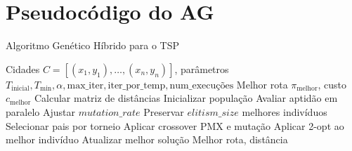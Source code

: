 \documentclass[11pt]{article}
\begin{document}
\section{Pseudocódigo do AG}\label{app:ag}
\begin{algorithm}
    \caption{Algoritmo Genético Híbrido para o TSP}
    \begin{algorithmic}[1]
        \Require Cidades \(C = [(x_1, y_1), \ldots, (x_n, y_n)]\), parâmetros \(T_{\text{inicial}}, T_{\text{min}}, \alpha, \text{max\_iter}, \text{iter\_por\_temp}, \text{num\_execuções}\)
        \Ensure Melhor rota \(\pi_{\text{melhor}}\), custo \(c_{\text{melhor}}\)
        \State Calcular matriz de distâncias
        \State Inicializar população
        \State Avaliar aptidão em paralelo
            \State Ajustar \(mutation\_rate\)
            \State Preservar \(elitism\_size\) melhores indivíduos
                \State Selecionar pais por torneio
                \State Aplicar crossover PMX e mutação
            \EndWhile
                \State Aplicar 2-opt ao melhor indivíduo
            \EndIf
            \State Atualizar melhor solução
        \EndFor
        \State \Return Melhor rota, distância
    \end{algorithmic}
\end{algorithm}
\end{document}
